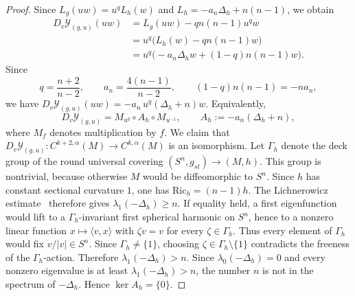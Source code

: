 \documentclass[12pt,oneside,a4paper]{article}
\theoremstyle{mytheorem}
\theoremstyle{remark}
\theoremstyle{definition}
\begin{document}
\begin{proof}
Since $L_g(uw)=u^qL_h(w)$ and $L_h=-a_n\Delta_h+n(n-1)$, we obtain
\[
\begin{aligned}
D_v\mathcal Y_{(g,u)}(uw)
&=L_g(uw)-qn(n-1)u^qw\\
&=u^q\bigl(L_h(w)-qn(n-1)w\bigr)\\
&=u^q\bigl(-a_n\Delta_h w+(1-q)n(n-1)w\bigr).
\end{aligned}
\]
Since
\[
q=\frac{n+2}{n-2},
\qquad
a_n=\frac{4(n-1)}{n-2},
\qquad
(1-q)n(n-1)=-na_n,
\]
we have
\(
D_v\mathcal Y_{(g,u)}(uw)=-a_n\,u^q(\Delta_h+n)w.
\)
Equivalently,
\[
D_v\mathcal Y_{(g,u)}=M_{u^q}\circ A_h\circ M_{u^{-1}},
\qquad
A_h:=-a_n(\Delta_h+n),
\]
where \(M_f\) denotes multiplication by \(f\). We claim that
\(D_v\mathcal Y_{(g,u)}:C^{k+2,\alpha}(M)\to  C^{k,\alpha}(M)\)
is an isomorphism. Let $\Gamma_h$ denote the deck group of the round universal
covering
\(
(S^n,g_{st})\to (M,h).
\)
This group is nontrivial, because otherwise $M$ would be diffeomorphic to
$S^n$. Since $h$ has constant sectional curvature $1$, one has
$\mathrm{Ric}_h=(n-1)h$. The Lichnerowicz estimate~\cite{zbMATH03156874}
therefore gives
\(
\lambda_1(-\Delta_h)\ge n.
\)
If equality held, a first eigenfunction would
lift to a $\Gamma_h$-invariant first spherical harmonic on $S^n$, hence to a
nonzero linear function $x\mapsto\langle v,x\rangle$ with
$\zeta v=v$ for every $\zeta\in\Gamma_h$. Thus every element of $\Gamma_h$
would fix $v/|v|\in S^n$. Since $\Gamma_h\neq\{1\}$, choosing
$\zeta\in\Gamma_h\setminus\{1\}$ contradicts the freeness of the
$\Gamma_h$-action. Therefore
\(
\lambda_1(-\Delta_h)>n.
\)
Since $\lambda_0(-\Delta_h)=0$ and every nonzero eigenvalue is at least
$\lambda_1(-\Delta_h)>n$, the number $n$ is not in the spectrum of
$-\Delta_h$. Hence $\ker A_h=\{0\}$.


\end{proof}
\end{document}
